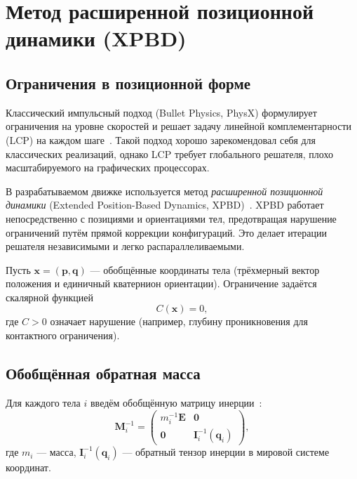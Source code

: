 \section{Метод расширенной позиционной динамики (XPBD)}

\subsection{Ограничения в позиционной форме}

Классический импульсный подход (Bullet Physics, PhysX) формулирует ограничения на уровне скоростей и решает 
задачу линейной комплементарности (LCP) на каждом шаге~\cite{catto2005iterative}. Такой подход хорошо 
зарекомендовал себя для классических реализаций, однако LCP требует глобального решателя, плохо 
масштабируемого на графических процессорах.

В разрабатываемом движке используется метод \textit{расширенной позиционной динамики} (Extended Position-Based 
Dynamics, XPBD)~\cite{macklin2016xpbd}. XPBD работает непосредственно с позициями и ориентациями тел, 
предотвращая нарушение ограничений путём прямой коррекции конфигураций. Это делает итерации решателя 
независимыми и легко распараллеливаемыми.

Пусть $\mathbf{x} = (\mathbf{p}, \mathbf{q})$ --- обобщённые координаты тела
(трёхмерный вектор положения и единичный кватернион ориентации).
Ограничение задаётся скалярной функцией
\begin{equation}
  C(\mathbf{x}) = 0,
  \label{eq:constraint}
\end{equation}
где $C > 0$ означает нарушение (например, глубину проникновения для контактного ограничения).

\subsection{Обобщённая обратная масса}

Для каждого тела $i$ введём обобщённую матрицу инерции~\cite{baraff1997physically}:
\begin{equation}
  \mathbf{M}_i^{-1} = \begin{pmatrix} m_i^{-1}\mathbf{E} & \mathbf{0} \\ \mathbf{0} & \mathbf{I}_i^{-1}(\mathbf{q}_i) \end{pmatrix},
  \label{eq:gen-mass}
\end{equation}
где $m_i$ --- масса, $\mathbf{I}_i^{-1}(\mathbf{q}_i)$ --- обратный тензор инерции в мировой системе координат.

